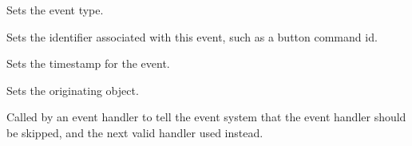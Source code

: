 
Sets the event type.



Sets the identifier associated with this event, such as a button command id.



Sets the timestamp for the event.

Sets the originating object.

\label{wxeventskip}


Called by an event handler to tell the event system that the
event handler should be skipped, and the next valid handler used
instead.

